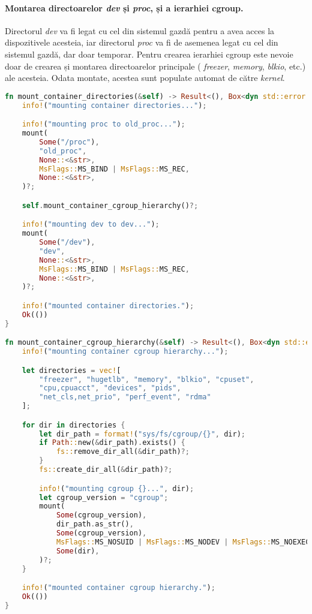            \paragraph{Montarea directoarelor \textit{dev} și \textit{proc}, și a ierarhiei cgroup.} Directorul \textit{dev} va fi legat cu cel din sistemul gazdă pentru a avea acces la dispozitivele acesteia, iar directorul \textit{proc} va fi de asemenea legat cu cel din sistemul gazdă, dar doar temporar. Pentru crearea ierarhiei cgroup este nevoie doar de crearea și montarea directoarelor principale ( \textit{freezer}, \textit{memory}, \textit{blkio}, etc.) ale acesteia. Odata montate, acestea sunt populate automat de către \textit{kernel}.
            \begin{lstlisting}[language=Rust, style=boxed, caption={Montarea directoarelor \textit{dev} și \textit{proc}, și a ierarhiei cgroup},captionpos=b]
fn mount_container_directories(&self) -> Result<(), Box<dyn std::error::Error>> {
    info!("mounting container directories...");

    info!("mounting proc to old_proc...");
    mount(
        Some("/proc"),
        "old_proc",
        None::<&str>,
        MsFlags::MS_BIND | MsFlags::MS_REC,
        None::<&str>,
    )?;

    self.mount_container_cgroup_hierarchy()?;

    info!("mounting dev to dev...");
    mount(
        Some("/dev"),
        "dev",
        None::<&str>,
        MsFlags::MS_BIND | MsFlags::MS_REC,
        None::<&str>,
    )?;

    info!("mounted container directories.");
    Ok(())
}

fn mount_container_cgroup_hierarchy(&self) -> Result<(), Box<dyn std::error::Error>> {
    info!("mounting container cgroup hierarchy...");

    let directories = vec![
        "freezer", "hugetlb", "memory", "blkio", "cpuset",
        "cpu,cpuacct", "devices", "pids",
        "net_cls,net_prio", "perf_event", "rdma"
    ];

    for dir in directories {
        let dir_path = format!("sys/fs/cgroup/{}", dir);
        if Path::new(&dir_path).exists() {
            fs::remove_dir_all(&dir_path)?;
        }
        fs::create_dir_all(&dir_path)?;

        info!("mounting cgroup {}...", dir);
        let cgroup_version = "cgroup";
        mount(
            Some(cgroup_version),
            dir_path.as_str(),
            Some(cgroup_version),
            MsFlags::MS_NOSUID | MsFlags::MS_NODEV | MsFlags::MS_NOEXEC,
            Some(dir),
        )?;
    }

    info!("mounted container cgroup hierarchy.");
    Ok(())
}           \end{lstlisting}
            \label{fig:cod_mount2}
